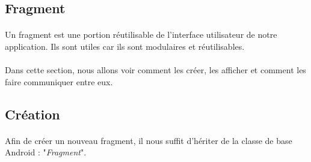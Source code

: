 \documentclass[a4paper]{article}
\begin{document}
    \newpage
    \begin{multicols}{2}
        [
        ]
        \section{Fragment}
            \paragraph{}
                Un fragment est une portion réutilisable de l'interface utilisateur de notre application. Ils sont utiles car ils sont modulaires et réutilisables. 
            \paragraph{}
                Dans cette section, nous allons voir comment les créer, les afficher et comment les faire communiquer entre eux.
            \subsection{Création}
                \paragraph{}
                    Afin de créer un nouveau fragment, il nous suffit d'hériter de la classe de base Android : "\emph{Fragment}".


\end{multicols}
\end{document}
